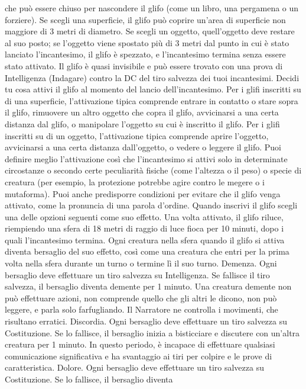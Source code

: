 \begin{multicols}{2}
che può essere chiuso per nascondere il glifo (come un
libro, una pergamena o un forziere). Se scegli una
superficie, il glifo può coprire un’area di superficie non
maggiore di 3 metri di diametro. Se scegli un oggetto,
quell’oggetto deve restare al suo posto; se l’oggetto 
viene spostato più di 3 metri dal punto in cui è stato
lanciato l’incantesimo, il glifo è spezzato, e
l’incantesimo termina senza essere stato attivato.
Il glifo è quasi invisibile e può essere trovato con una
prova di Intelligenza (Indagare) contro la DC del tiro
salvezza dei tuoi incantesimi.
Decidi tu cosa attivi il glifo al momento del lancio
dell’incantesimo.
Per i glifi inscritti su di una superficie, l’attivazione tipica
comprende entrare in contatto o stare sopra il glifo,
rimuovere un altro oggetto che copra il glifo, avvicinarsi
a una certa distanza dal glifo, o manipolare l’oggetto su
cui è inscritto il glifo.
Per i glifi inscritti su di un oggetto, l’attivazione tipica
comprende aprire l’oggetto, avvicinarsi a una certa
distanza dall’oggetto, o vedere o leggere il glifo.
Puoi definire meglio l’attivazione così che l’incantesimo
si attivi solo in determinate circostanze o secondo certe
peculiarità fisiche (come l’altezza o il peso) o specie di
creatura (per esempio, la protezione potrebbe agire
contro le megere o i mutaforma). Puoi anche
predisporre condizioni per evitare che il glifo venga
attivato, come la pronuncia di una parola d’ordine.
Quando inscrivi il glifo scegli una delle opzioni seguenti
come suo effetto. Una volta attivato, il glifo riluce,
riempiendo una sfera di 18 metri di raggio di luce fioca
per 10 minuti, dopo i quali l’incantesimo termina. Ogni
creatura nella sfera quando il glifo si attiva diventa
bersaglio del suo effetto, così come una creatura che
entri per la prima volta nella sfera durante un turno o
termine lì il suo turno.
Demenza. Ogni bersaglio deve effettuare un tiro
salvezza su Intelligenza. Se fallisce il tiro salvezza, il
bersaglio diventa demente per 1 minuto. Una creatura
demente non può effettuare azioni, non comprende
quello che gli altri le dicono, non può leggere, e parla
solo farfugliando. Il Narratore ne controlla i movimenti, che
risultano erratici.
Discordia. Ogni bersaglio deve effettuare un tiro
salvezza su Costituzione. Se lo fallisce, il bersaglio
inizia a bisticciare e discutere con un’altra creatura per
1 minuto. In questo periodo, è incapace di effettuare
qualsiasi comunicazione significativa e ha svantaggio ai
tiri per colpire e le prove di caratteristica.
Dolore. Ogni bersaglio deve effettuare un tiro salvezza
su Costituzione. Se lo fallisce, il bersaglio diventa

\end{multicols}
